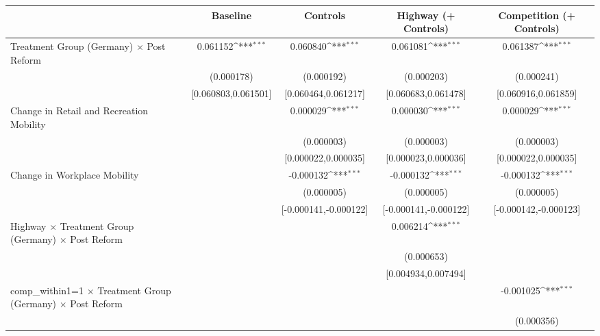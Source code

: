 {
\def\sym#1{\ifmmode^{#1}\else\(^{#1}\)\fi}
\begin{tabular}{l*{4}{c}}
\toprule
                    &\multicolumn{1}{c}{Baseline}&\multicolumn{1}{c}{Controls}&\multicolumn{1}{c}{Highway (+ Controls)}&\multicolumn{1}{c}{Competition (+ Controls)}\\
\midrule
Treatment Group (Germany) $\times$ Post Reform&    0.061152\sym{***}&    0.060840\sym{***}&    0.061081\sym{***}&    0.061387\sym{***}\\
                    &  (0.000178)         &  (0.000192)         &  (0.000203)         &  (0.000241)         \\
                    &[0.060803,0.061501]         &[0.060464,0.061217]         &[0.060683,0.061478]         &[0.060916,0.061859]         \\
Change in Retail and Recreation Mobility&                     &    0.000029\sym{***}&    0.000030\sym{***}&    0.000029\sym{***}\\
                    &                     &  (0.000003)         &  (0.000003)         &  (0.000003)         \\
                    &                     &[0.000022,0.000035]         &[0.000023,0.000036]         &[0.000022,0.000035]         \\
Change in Workplace Mobility&                     &   -0.000132\sym{***}&   -0.000132\sym{***}&   -0.000132\sym{***}\\
                    &                     &  (0.000005)         &  (0.000005)         &  (0.000005)         \\
                    &                     &[-0.000141,-0.000122]         &[-0.000141,-0.000122]         &[-0.000142,-0.000123]         \\
Highway $\times$ Treatment Group (Germany) $\times$ Post Reform&                     &                     &    0.006214\sym{***}&                     \\
                    &                     &                     &  (0.000653)         &                     \\
                    &                     &                     &[0.004934,0.007494]         &                     \\
comp\_within1=1 $\times$ Treatment Group (Germany) $\times$ Post Reform&                     &                     &                     &   -0.001025\sym{***}\\
                    &                     &                     &                     &  (0.000356)         \\

\end{tabular}}
